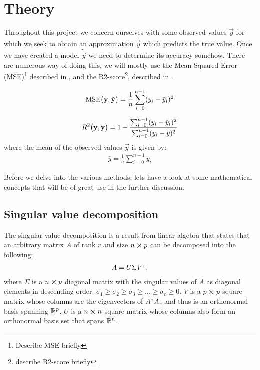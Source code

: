 \section{Theory}\label{sec:theroy}



Throughout this project we concern ourselves with some observed values $\vec{y}$ for which we seek to obtain an approximation $\tilde{\vec{y}}$ which predicts the true value. Once we have created a model $\tilde{\vec{y}}$ we need to determine its accuracy somehow. There are numerous way of doing this, we will mostly use the Mean Squared Error (MSE)\footnote{Describe MSE briefly} described in , and the R2-score\footnote{describe R2-score briefly}, described in .


\begin{align}\label{eq:MSE}
    \MSE{\vec{y}, \tilde{\vec{y}}}= \frac{1}{n}\sum_{i=0}^{n-1} (y_i - \tilde{y}_i)^2
\end{align}

\begin{align}\label{eq:R2}
    \Rtwo {\vec{y}, \tilde{\vec{y}}} = 1 - \frac{\sum_{i=0}^{n-1}(y_i-\tilde{y}_i)^2}{\sum_{i=0}^{n-1}(y_i-\bar{y})^2}
\end{align}
where the mean of the observed values $\vec{y}$ is given by:
\begin{align*}
    \bar{y} = \frac{1}{n}\sum_{i=0}^{n-1} y_i
\end{align*}


Before we delve into the various methods, lets have a look at some mathematical concepts that will be of great use in the further discussion. 

\subsection{Singular value decomposition}\label{sec:SVD}
    The singular value decomposition is a result from linear algebra that states that an arbitrary matrix $A$ of rank $r$ and size $n\cross p$ can be decomposed into the following\cite{svd}:
    \begin{align}\label{eq:svd}
        A = U\Sigma V\TT,
    \end{align}
    where $\Sigma$ is a $n\cross p$ diagonal matrix with the singular values of $A$ as diagonal elements in descending order: $\sigma_1\geq\sigma_2\geq\sigma_3\geq\dots\geq\sigma_r\geq 0$. $V$ is a $p\cross p$ square matrix whose columns are the eigenvectors of $A\TT A$, and thus is an orthonormal basis spanning $\RR[p]$.  $U$ is a $n\cross n$ square matrix whose columns also form an orthonormal basis set that spans $\RR[n]$. 

